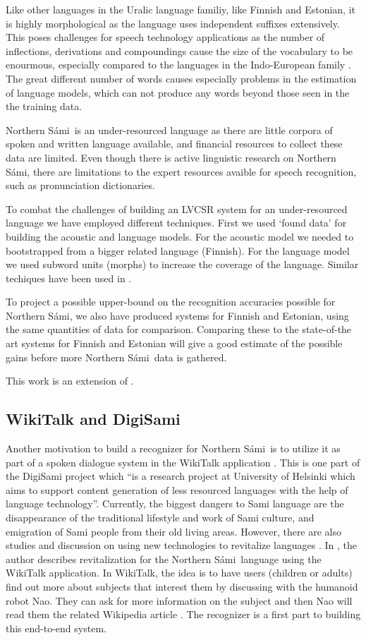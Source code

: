 \documentclass[b5paper]{article}
\newcommand{\ns}{Northern Sámi}
\begin{document}
Like other languages in the Uralic language familiy, like Finnish and Estonian, it is highly morphological as the language uses independent suffixes extensively. This poses challenges for speech technology applications as the number of inflections, derivations and compoundings cause the size of the vocabulary to be enourmous, especially compared to the languages in the Indo-European family \cite{karlsson1982}.  The great different number of words causes especially problems in the estimation of language models, which can not produce any words beyond those seen in the the training data. 

\ns\ is an under-resourced language as there are little corpora of spoken and written language available, and financial resources to collect these data are limited. Even though there is active linguistic research on \ns, there are limitations to the expert resources avaible for speech recognition, such as pronunciation dictionaries. 

To combat the challenges of building an LVCSR system for an under-resourced language we have employed different techniques. First we used `found data' for building the acoustic and language models. For the acoustic model we needed to bootstrapped from a bigger related language (Finnish). For the language model we used subword units (morphs) to increase the coverage of the language. Similar techiques have been used in \cite{besacier2014automatic,viet2009}.

To project a possible upper-bound on the recognition accuracies possible for \ns, we also have produced systems for Finnish and Estonian, using the same quantities of data for comparison. Comparing these to the state-of-the art systems for Finnish and Estonian will give a good estimate of the possible gains before more \ns\ data is gathered.

This work is an extension of \cite{leinonen2015}.

\subsection{WikiTalk and DigiSami}
Another motivation to build a recognizer for \ns\ is to utilize it as part of  a spoken dialogue system in the WikiTalk application \cite{wilcock2013wikitalk}. This is one part of the DigiSami project which ``is a research project at University of Helsinki which aims to support content generation of less resourced languages with the help of language technology''. Currently, the biggest dangers to Sami language are the disappearance of the traditional lifestyle and work of Sami culture, and emigration of Sami people from their old living areas. However, there are also studies and discussion on using new technologies to revitalize languages \cite{eisenlohr2004language}. In \cite{jokinen2014open}, the author describes revitalization for the \ns\ language using the WikiTalk application. In WikiTalk, the idea is to have users (children or adults) find out more about subjects that interest them by discussing with the humanoid robot Nao. They can ask for more information on the subject and then Nao will read them the related Wikipedia article \cite{jokinen2014multimodal}. The recognizer is a first part to building this end-to-end system.
\end{document}
